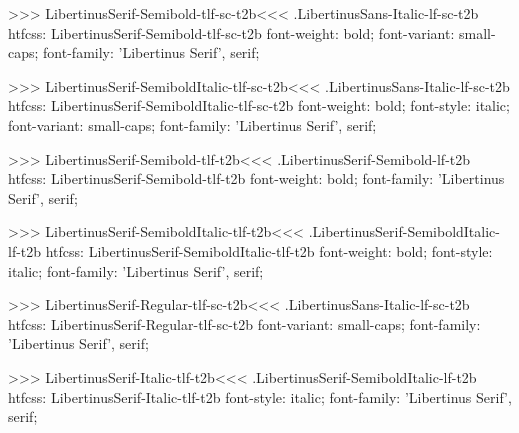 {{{{{{{{{{>>>
\<LibertinusSerif-Semibold-tlf-sc-t2b\><<<
.LibertinusSans-Italic-lf-sc-t2b
htfcss:  LibertinusSerif-Semibold-tlf-sc-t2b  font-weight: bold; font-variant: small-caps; font-family: 'Libertinus Serif', serif;

>>>
\<LibertinusSerif-SemiboldItalic-tlf-sc-t2b\><<<
.LibertinusSans-Italic-lf-sc-t2b
htfcss:  LibertinusSerif-SemiboldItalic-tlf-sc-t2b  font-weight: bold; font-style: italic; font-variant: small-caps; font-family: 'Libertinus Serif', serif;

>>>
\<LibertinusSerif-Semibold-tlf-t2b\><<<
.LibertinusSerif-Semibold-lf-t2b
htfcss:  LibertinusSerif-Semibold-tlf-t2b  font-weight: bold; font-family: 'Libertinus Serif', serif;

>>>
\<LibertinusSerif-SemiboldItalic-tlf-t2b\><<<
.LibertinusSerif-SemiboldItalic-lf-t2b
htfcss:  LibertinusSerif-SemiboldItalic-tlf-t2b  font-weight: bold; font-style: italic; font-family: 'Libertinus Serif', serif;

>>>
\<LibertinusSerif-Regular-tlf-sc-t2b\><<<
.LibertinusSans-Italic-lf-sc-t2b
htfcss:  LibertinusSerif-Regular-tlf-sc-t2b  font-variant: small-caps; font-family: 'Libertinus Serif', serif;

>>>
\<LibertinusSerif-Italic-tlf-t2b\><<<
.LibertinusSerif-SemiboldItalic-lf-t2b
htfcss:  LibertinusSerif-Italic-tlf-t2b  font-style: italic; font-family: 'Libertinus Serif', serif;

}}}}}}}}}}
